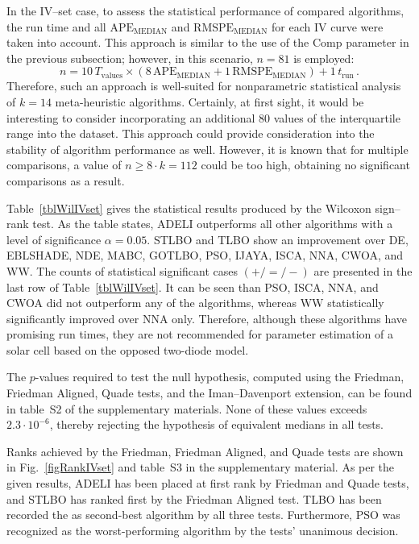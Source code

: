 \documentclass[a4paper,fleqn]{cas-dc}
\begin{document}
In the IV--set case, to assess the statistical performance of compared algorithms,
the run time and all $\mathrm{APE}_\mathrm{MEDIAN}$ and $\mathrm{RMSPE}_\mathrm{MEDIAN}$ for each IV curve were taken into account.
This approach is similar to the use of the Comp parameter in the previous subsection;
however, in this scenario, $n=81$ is employed:
\begin{equation*}
n= 10\,T_\mathrm{values}\times(8\,\mathrm{APE}_\mathrm{MEDIAN}+1\,\mathrm{RMSPE}_\mathrm{MEDIAN})+1\,t_\mathrm{run}\,.
\end{equation*}
Therefore, such an approach is well-suited for nonparametric statistical analysis of $k=14$ meta-heuristic algorithms.
Certainly, at first sight, it would be interesting to consider incorporating an additional 80 values of the interquartile range into the dataset.
This approach could provide consideration into the stability of algorithm performance as well.
However, it is known \cite{Derrac2011} that for multiple comparisons, a value of $n\geq 8\cdot k=112$ could be too high, obtaining
no significant comparisons as a result.

Table~\ref{tblWilIVset}  gives the statistical results produced by the Wilcoxon sign--rank test.
As the table states, ADELI outperforms all other algorithms with a level of significance $\alpha = 0.05$.
STLBO and TLBO show an improvement over
DE, EBLSHADE, NDE, MABC, GOTLBO, PSO, IJAYA, ISCA, NNA, CWOA, and WW.
The counts of statistical significant cases $(+/=/-)$ are presented in the last row of Table~\ref{tblWilIVset}.
It can be seen than PSO, ISCA, NNA, and CWOA did not outperform any of the algorithms,
whereas WW statistically significantly improved over  NNA only.
Therefore, although these algorithms have promising run times,
they are not recommended for parameter estimation of a solar cell based on the opposed two-diode model.

The $p$-values required to test the null hypothesis,
computed using the Friedman, Friedman Aligned, Quade tests, and the Iman--Davenport extension,
can be found in table~S2 of the supplementary materials.
None of these values exceeds $2.3\cdot10^{-6}$, thereby rejecting the hypothesis of equivalent medians in all tests.

Ranks achieved by the Friedman, Friedman Aligned, and Quade tests are shown in Fig.~\ref{figRankIVset} and table~S3 in the supplementary material.
As per the given results, ADELI has been placed at first rank by Friedman and Quade tests,
and STLBO has ranked first by the Friedman Aligned test.
TLBO has been recorded the as second-best algorithm by all three tests.
Furthermore, PSO was recognized as the worst-performing algorithm by the tests' unanimous decision.
\end{document}
